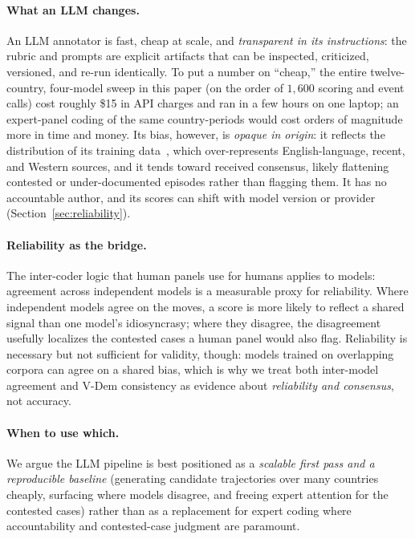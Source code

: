 \documentclass[twocolumn,10pt]{article}
\begin{document}
\paragraph{What an LLM changes.} An LLM annotator is fast, cheap at scale,
and \emph{transparent in its instructions}: the rubric and prompts are explicit
artifacts that can be inspected, criticized, versioned, and re-run identically.
To put a number on ``cheap,'' the entire twelve-country, four-model sweep in this
paper (on the order of $1{,}600$ scoring and event calls) cost roughly \$15 in
API charges and ran in a few hours on one laptop; an expert-panel coding of
the same country-periods would cost orders of magnitude more in time and money.
Its bias, however, is \emph{opaque in origin}: it reflects the distribution of
its training data~\citep{bender2021dangers,santurkar2023whose,feng2023pretraining},
which over-represents English-language, recent, and Western sources, and it tends
toward received consensus, likely flattening contested or under-documented
episodes rather than flagging them. It has no accountable author, and its scores
can shift with model version or provider (Section~\ref{sec:reliability}).

\paragraph{Reliability as the bridge.} The inter-coder logic that human panels
use for humans applies to models: agreement across independent models is a
measurable proxy for reliability. Where independent models agree on the moves, a
score is more likely to reflect a shared signal than one model's idiosyncrasy;
where they disagree, the disagreement usefully localizes the contested cases a
human panel would also flag. Reliability is necessary but not sufficient for
validity, though: models trained on overlapping corpora can agree on a shared
bias, which is why we treat both inter-model agreement and V-Dem consistency
as evidence about \emph{reliability and consensus}, not accuracy.

\paragraph{When to use which.} We argue the LLM pipeline is best positioned as a
\emph{scalable first pass and a reproducible baseline} (generating candidate
trajectories over many countries cheaply, surfacing where models disagree, and
freeing expert attention for the contested cases) rather than as a replacement
for expert coding where accountability and contested-case judgment are
paramount.
\end{document}
